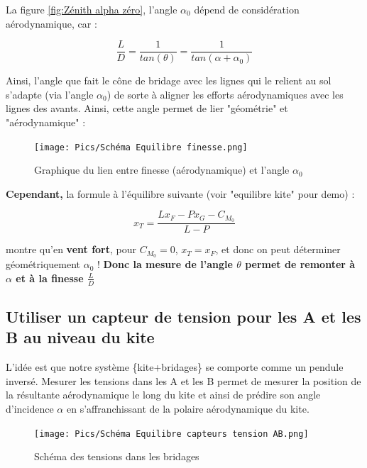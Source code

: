 \documentclass[conference]{IEEEtran}
\begin{document}
La figure \ref{fig:Zénith alpha zéro}, l'angle $\alpha_0$ dépend de considération aérodynamique, car : 
\begin{center}
    \begin{equation}
        \frac{L}{D} = \frac{1}{tan(\theta)} = \frac{1}{tan(\alpha + \alpha_0)}
    \end{equation}
\end{center}
Ainsi, l'angle que fait le cône de bridage avec les lignes qui le relient au sol s'adapte (via l'angle $\alpha_0$) de sorte à aligner les efforts aérodynamiques avec les lignes des avants. Ainsi, cette angle permet de lier "géométrie" et "aérodynamique" :  

\begin{figure}[H]
    \centering
    \texttt{[image: Pics/Schéma Equilibre finesse.png]}  
    \caption{Graphique du lien entre finesse (aérodynamique) et l'angle $\alpha_0$}
    \label{fig:Zénith finesse}
\end{figure}

\textbf{Cependant,} la formule à l'équilibre suivante (voir "equilibre kite" pour demo) : 

\begin{center}
    \begin{equation}
        x_T = \frac{L x_F - P x_G -C_{M_0}}{L - P}
    \end{equation}
\end{center}

montre qu'en \textbf{vent fort}, pour $C_{M_0} = 0$, $x_T = x_F$, et donc on peut déterminer géométriquement $\alpha_0$ ! \textbf{Donc la mesure de l'angle $\theta$ permet de remonter à $\alpha$ et à la finesse $\frac{L}{D}$}

\subsection{Utiliser un capteur de tension pour les A et les B au niveau du kite}
\label{sec:tension AB}

L'idée est que notre système \{kite+bridages\} se comporte comme un pendule inversé. Mesurer les tensions dans les A et les B permet de mesurer la position de la résultante aérodynamique le long du kite et ainsi de prédire son angle d'incidence $\alpha$ en s'affranchissant de la polaire aérodynamique du kite. 

\begin{figure}[H]
    \centering
    \texttt{[image: Pics/Schéma Equilibre capteurs tension AB.png]}  
    \caption{Schéma des tensions dans les bridages}
    \label{fig:Zénith tensions AB}
\end{figure}
\end{document}
